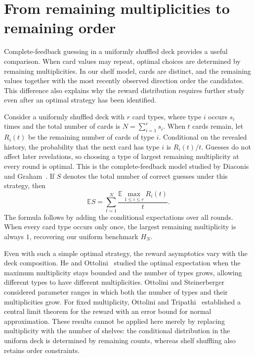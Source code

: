 \documentclass[11pt,reqno]{amsart}
\numberwithin{equation}{section}
\theoremstyle{definition}
\theoremstyle{remark}
\begin{document}
\section{From remaining multiplicities to remaining order}\label{app:comparison}
Complete-feedback guessing in a uniformly shuffled deck provides a useful comparison. When card values may repeat, optimal choices are determined by remaining multiplicities. In our shelf model, cards are distinct, and the remaining values together with the most recently observed direction order the candidates. This difference also explains why the reward distribution requires further study even after an optimal strategy has been identified.

Consider a uniformly shuffled deck with $r$ card types, where type $i$ occurs $s_i$ times and the total number of cards is $N=\sum_{i=1}^r s_i$. When $t$ cards remain, let $R_i(t)$ be the remaining number of cards of type $i$. Conditional on the revealed history, the probability that the next card has type $i$ is $R_i(t)/t$. Guesses do not affect later revelations, so choosing a type of largest remaining multiplicity at every round is optimal. This is the complete-feedback model studied by Diaconis and Graham~\cite[Section 2]{DG}. If $S$ denotes the total number of correct guesses under this strategy, then
\[
 \mathbb E S=\sum_{t=1}^{N}\frac{\mathbb E\max_{1\le i\le r}R_i(t)}{t}.
\]
The formula follows by adding the conditional expectations over all rounds. When every card type occurs only once, the largest remaining multiplicity is always $1$, recovering our uniform benchmark $H_N$.

Even with such a simple optimal strategy, the reward asymptotics vary with the deck composition. He and Ottolini~\cite{HO} studied the optimal expectation when the maximum multiplicity stays bounded and the number of types grows, allowing different types to have different multiplicities. Ottolini and Steinerberger~\cite{OS} considered parameter ranges in which both the number of types and their multiplicities grow. For fixed multiplicity, Ottolini and Tripathi~\cite{OT} established a central limit theorem for the reward with an error bound for normal approximation. These results cannot be applied here merely by replacing multiplicity with the number of shelves: the conditional distribution in the uniform deck is determined by remaining counts, whereas shelf shuffling also retains order constraints.
\end{document}
